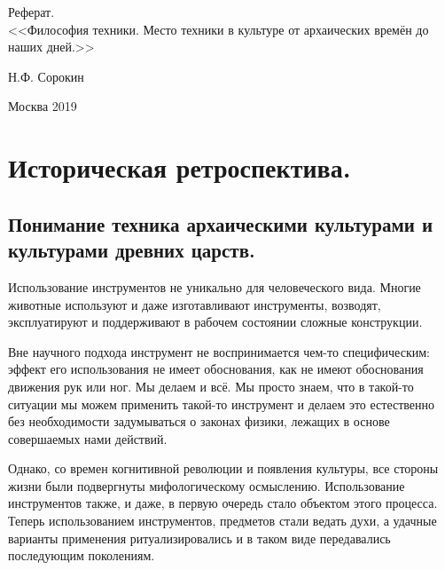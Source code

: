 \documentclass[a4paper]{article}
\begin{document}
\begin{center}
\hfill \break
\hfill\break
\hfill \break
\hfill \break
\hfill \break
\hfill \break
\hfill \break
\hfill \break
\hfill \break
\large{Реферат.}\\
\large{<<Философия техники. Место техники в культуре от архаических времён до наших дней.>>}\\
\hfill \break
\hfill \break
\hfill \break
\hfill \break
\hfill \break
\hfill \break
\hfill \break
\hfill \break
\end{center}
 
\normalsize{ 
\hspace{100mm}Н.Ф. Сорокин
\hfill \break
\hfill \break
\hfill \break
\hfill \break
\hfill \break
\hfill \break
\begin{center} Москва 2019 \end{center}
\thispagestyle{empty} %
\newpage

\tableofcontents
\newpage

\section{Историческая ретроспектива.}

\subsection{Понимание техника архаическими культурами и культурами древних царств.}
Использование инструментов не уникально для человеческого вида. Многие животные используют и даже изготавливают инструменты, возводят, эксплуатируют и поддерживают в рабочем состоянии сложные конструкции.

Вне научного подхода инструмент не воспринимается чем-то специфическим: эффект его использования не имеет обоснования, как не имеют обоснования движения рук или ног. Мы делаем и всё. Мы просто знаем, что в такой-то ситуации мы можем применить такой-то инструмент и делаем это естественно без необходимости задумываться о законах физики, лежащих в основе совершаемых нами действий. 

Однако, со времен когнитивной революции и появления культуры, все стороны жизни были подвергнуты мифологическому осмыслению. Использование инструментов также, и даже, в первую очередь стало объектом этого процесса. Теперь использованием инструментов, предметов стали ведать духи, а удачные варианты применения ритуализировались и в таком виде передавались последующим поколениям.

}
\end{document}
